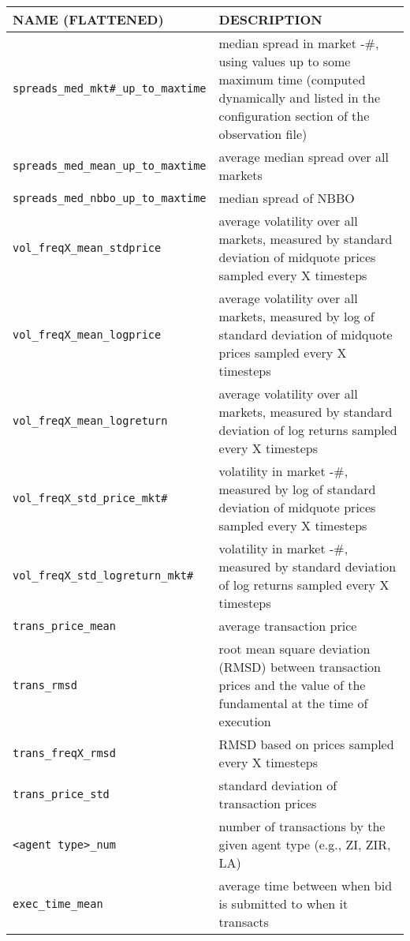 \documentclass[11pt]{article}
\begin{document}
\begin{table}
\centering
\begin{tabular}[f]{p{} p{}}
\uppercase{Name (Flattened)} 	& \uppercase{Description} \\ \hline
\verb|spreads_med_mkt#_up_to_maxtime|	& median spread in market -\#, using values up to some maximum time (computed dynamically and listed in the configuration section of the observation file) \\
\verb|spreads_med_mean_up_to_maxtime|	& average median spread over all markets \\
\verb|spreads_med_nbbo_up_to_maxtime|	& median spread of NBBO \\

\verb|vol_freqX_mean_stdprice| 	& average volatility over all markets, measured by standard deviation of midquote prices sampled every X timesteps \\
\verb|vol_freqX_mean_logprice| 	& average volatility over all markets, measured by log of standard deviation of midquote prices sampled every X timesteps \\
\verb|vol_freqX_mean_logreturn| 	& average volatility over all markets, measured by standard deviation of log returns sampled every X timesteps \\
\verb|vol_freqX_std_price_mkt#| 	& volatility in market -\#, measured by log of standard deviation of midquote prices sampled every X timesteps \\
\verb|vol_freqX_std_logreturn_mkt#| 	& volatility in market -\#, measured by standard deviation of log returns sampled every X timesteps \\

\verb|trans_price_mean|	& average transaction price \\
\verb|trans_rmsd|		& root mean square deviation (RMSD) between transaction prices and the value of the fundamental at the time of execution \\
\verb|trans_freqX_rmsd|	& RMSD based on prices sampled every X timesteps \\
\verb|trans_price_std|	& standard deviation of transaction prices \\
\verb|<agent type>_num|	& number of transactions by the given agent type (e.g., ZI, ZIR, LA) \\

\verb|exec_time_mean|	& average time between when bid is submitted to when it transacts \\


\end{tabular}
\end{table}
\end{document}
